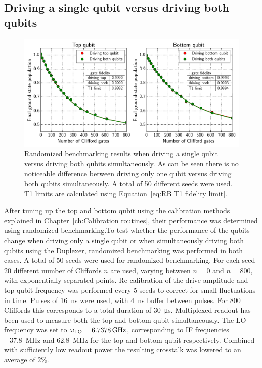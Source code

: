       \subsection{Driving a single qubit versus driving both qubits}
        \label{ssec:Driving a single qubit versus driving both qubits}

        \begin{figure}[tb]
          \centering
          \includegraphics[width=\textwidth]{../Figures/Randomized benchmarking/RB_normal_driving_single_both.png}
          \caption{Randomized benchmarking results when driving a single qubit versus driving both qubits simultaneously. As can be seen there is no noticeable difference between driving only one qubit versus driving both qubits simultaneously. A total of 50 different seeds were used. T1 limits are calculated using Equation~\ref{eq:RB T1 fidelity limit}.}
          \label{fig:RB normal single vs both}
        \end{figure}

        After tuning up the top and bottom qubit using the calibration methods explained in Chapter~\ref{ch:Calibration routines}, their performance was determined using randomized benchmarking.To test whether the performance of the qubits change when driving only a single qubit or when simultaneously driving both qubits using the Duplexer, randomized benchmarking was performed in both cases. A total of 50 seeds were used for randomized benchmarking. For each seed $20$ different number of Cliffords $n$ are used, varying between $n=0$ and $n=800$, with exponentially separated points. Re-calibration of the drive amplitude and top qubit frequency was performed every 5 seeds to correct for small fluctuations in time. Pulses of \SI{16}{\nano \second} were used, with \SI{4}{\nano \second} buffer between pulses. For $800$ Cliffords this corresponds to a total duration of \SI{30}{\micro \second}. Multiplexed readout has been used to measure both the top and bottom qubit simultaneously. The LO frequency was set to $\omega_\text{LO}=\text{\ensuremath{\SI{6.7378}{\giga \hertz}}}$, corresponding to IF frequencies \SI{-37.8}{\mega \hertz} and \SI{62.8}{\mega \hertz} for the top and bottom qubit respectively. Combined with sufficiently low readout power the resulting crosstalk was lowered to an average of $2\%$.

